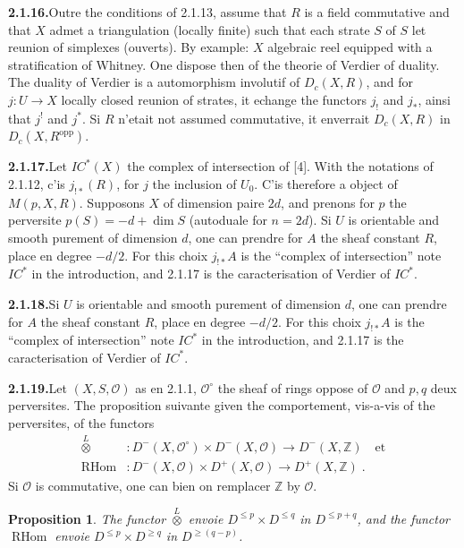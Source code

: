 \documentclass[12pt,a4paper]{article}
\theoremstyle{plain}
\newtheorem{proposition}[theorem]{Proposition}
\theoremstyle{definition}
\DeclareMathOperator{\RHom}{RHom}
\begin{document}
\smallskip
\noindent\textbf{2.1.16.}\quad Outre the conditions of 2.1.13, assume that $R$ is a field commutative and that $X$ admet a triangulation (locally finite) such that each strate $S$ of $S$ let reunion of simplexes (ouverts). By example: $X$ algebraic reel equipped with a stratification of Whitney. One dispose then of the theorie of Verdier of duality. The duality of Verdier is a automorphism involutif of $D_c(X, R)$, and for $j : U \to X$ locally closed reunion of strates, it echange the functors $j_!$ and $j_*$, ainsi that $j^!$ and $j^*$. Si $R$ n'etait not assumed commutative, it enverrait $D_c(X, R)$ in $D_c(X, R^{\mathrm{opp}})$.

\smallskip
\noindent\textbf{2.1.17.}\quad Let $IC^*(X)$ the complex of intersection of [4]. With the notations of 2.1.12, c'is $j_{!*}(R)$, for $j$ the inclusion of $U_0$. C'is therefore a object of $M(p, X, R)$. Supposons $X$ of dimension paire $2d$, and prenons for $p$ the perversite $p(S) = -d + \dim S$ (autoduale for $n = 2d$). Si $U$ is orientable and smooth purement of dimension $d$, one can prendre for $A$ the sheaf constant $R$, place en degree $-d/2$. For this choix $j_{!*} A$ is the ``complex of intersection'' note $IC^*$ in the introduction, and 2.1.17 is the caracterisation of Verdier of $IC^*$.

\smallskip
\noindent\textbf{2.1.18.}\quad Si $U$ is orientable and smooth purement of dimension $d$, one can prendre for $A$ the sheaf constant $R$, place en degree $-d/2$. For this choix $j_{!*} A$ is the ``complex of intersection'' note $IC^*$ in the introduction, and 2.1.17 is the caracterisation of Verdier of $IC^*$.

\smallskip
\noindent\textbf{2.1.19.}\quad Let $(X, S, \mathcal{O})$ as en 2.1.1, $\mathcal{O}^\circ$ the sheaf of rings oppose of $\mathcal{O}$ and $p, q$ deux perversites. The proposition suivante given the comportement, vis-a-vis of the perversites, of the functors
\begin{align*}
\overset{L}{\otimes} &: D^-(X, \mathcal{O}^\circ) \times D^-(X, \mathcal{O}) \to D^-(X, \mathbb{Z}) \quad\text{et}\\
\RHom &: D^-(X, \mathcal{O}) \times D^+(X, \mathcal{O}) \to D^+(X, \mathbb{Z})\;.
\end{align*}
Si $\mathcal{O}$ is commutative, one can bien on remplacer $\mathbb{Z}$ by $\mathcal{O}$.

\begin{proposition}\label{prop:2.1.20}
The functor $\overset{L}{\otimes}$ envoie $D^{\leqslant p} \times D^{\leqslant q}$ in $D^{\leqslant p+q}$, and the functor $\RHom$ envoie $D^{\leqslant p} \times D^{\geqslant q}$ in $D^{\geqslant (q-p)}$.
\end{proposition}
\end{document}
